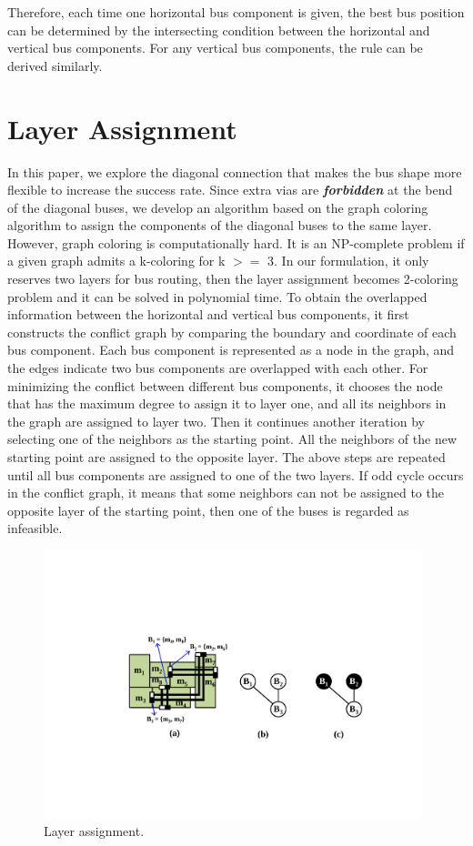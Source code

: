 Therefore, each time one horizontal bus component is given, the best bus position can be determined by the
intersecting condition between the horizontal and vertical bus components. For any vertical bus components, the rule can be derived similarly.

\section{Layer Assignment} \label{sec::Layer Assignment}
In this paper, we explore the diagonal connection
that makes the bus shape more flexible to increase the success rate.
Since extra vias are \textbf{\textit{forbidden}} at the bend of the diagonal
buses, we develop an algorithm based on the graph coloring
algorithm to assign the components of the diagonal buses to the
same layer. However, graph coloring is computationally hard. It is
an NP-complete problem if a given graph admits a k-coloring for k
$>=$ 3. In our formulation, it only reserves two layers for bus
routing, then the layer assignment becomes 2-coloring problem and
it can be solved in polynomial time. To obtain the overlapped
information between the horizontal and vertical bus components, it first
constructs the conflict graph by comparing the boundary and
coordinate of each bus component. Each bus component is represented as a node in the
graph, and the edges indicate two bus components are overlapped with each other.
For minimizing the conflict between different bus components, it chooses the node that
has the maximum degree to assign it to layer one, and all its
neighbors in the graph are assigned to layer two. Then it
continues another iteration by selecting one of the neighbors as
the starting point. All the neighbors of the new starting point
are assigned to the opposite layer. The above steps are repeated
until all bus components are assigned to one of the two layers. If odd
cycle occurs in the conflict graph, it means that some neighbors can
not be assigned to the opposite layer of the starting point, then one
of the buses is regarded as infeasible.

\begin{figure}[htb]
  \centering
    \includegraphics[width=11cm]{Fig/layer_assignment.pdf}
     \caption{
      Layer assignment.
   }
  \label{fig::layer_assignment}
\end{figure}

